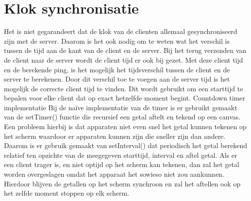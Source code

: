 \documentclass[a4paper,11pt]{article}
\begin{document}
\section{Klok synchronisatie}
Het is niet gegarandeert dat de klok van de clienten allemaal gesynchroniseerd zijn met de server. Daarom is het ook nodig om te weten wat het verschil is tussen de tijd aan de kant van de client en de server.
Bij het terug verzenden van de client naar de server wordt de client tijd er ook bij gezet. Met deze client tijd en de berekende ping, is het mogelijk het tijdsverschil tussen de client en de server te berekenen. Door dit verschil toe te voegen aan de server tijd is het mogelijk de correcte client tijd te vinden. Dit wordt gebruikt om een starttijd te bepalen voor elke client dat op exact hetzelfde moment begint.
Countdown timer implementatie
Bij de naïve implementatie van de timer is er gebruikt gemaakt van de setTimer() functie die recursief een getal aftelt en tekend op een canvas. Een probleem hierbij is dat apparaten niet even snel het getal kunnen tekenen op het scherm waardoor er apparaten kunnen zijn die sneller zijn dan andere.
Daarom is er gebruik gemaakt van setInterval() dat periodisch het getal berekend relatief ten opzichte van de meegegeven starttijd, interval en aftel getal. Als er een client trager is, en niet optijd op het scherm kan tekenen, dan zal het getal worden overgeslagen omdat het apparaat het sowieso niet zou aankunnen. Hierdoor blijven de getallen op het scherm synchroon en zal het aftellen ook op het zelfde moment stoppen op elk scherm.
\end{document}
